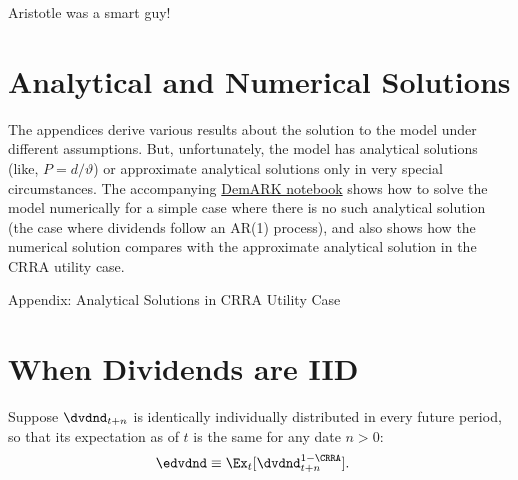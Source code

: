 \documentclass{handout}
\begin{document}
Aristotle was a smart guy!

\section{Analytical and Numerical Solutions}

The appendices derive various results about the solution to the model under
different assumptions.  But, unfortunately, the model has analytical solutions
(like, $P = d/\vartheta$) or approximate analytical solutions only in very special circumstances.  The accompanying
\href{https://mybinder.org/v2/gh/econ-ark/DemARK/HEAD?filepath=notebooks/Lucas-Asset-Pricing-Model.ipynb}{DemARK notebook}
shows how to solve the model numerically for a simple case where there is no
such analytical solution (the case where dividends follow an AR(1) process), and also shows
how the numerical solution compares with the approximate analytical solution in the CRRA utility case.

\pagebreak
\appendix {} %

\centerline{\Large Appendix:  Analytical Solutions in CRRA Utility Case}

\medskip\medskip\medskip

\section{When Dividends are IID}


Suppose $\dvdnd_{t+n}$ is identically individually distributed in every future period, so that its expectation as of $t$ is the same for any date $n>0$:
\begin{equation}\begin{gathered}\begin{aligned}
  \edvdnd & \equiv  \Ex_{t}[\dvdnd_{t+n}^{1-\CRRA}].   \label{eq:dmod}
\end{aligned}\end{gathered}\end{equation}
\end{document}
